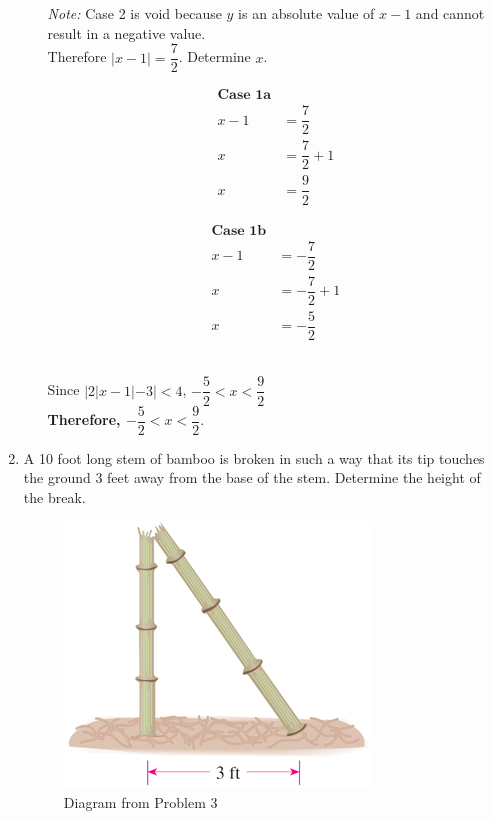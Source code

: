 \documentclass[12pt]{book}
\begin{document}
\begin{enumerate}
\begin{enumerate}
 \textit{Note:} Case 2 is void because $y$ is an absolute value of $x - 1$ and cannot result in a negative value.\\

Therefore $|x-1| = \dfrac{7}{2}$. Determine $x$.\\
\begin{minipage}{.5\textwidth}
    \begin{align*}
    \textbf{Case 1a}\\
        x - 1 &= \dfrac{7}{2}\\
        x &= \dfrac{7}{2} + 1\\
        x &= \dfrac{9}{2}
    \end{align*}      
    \end{minipage}
    \begin{minipage}{.5\textwidth}
    \begin{align*}
    \textbf{Case 1b}\\
        x - 1 &= -\dfrac{7}{2}\\
        x &= -\dfrac{7}{2} + 1\\
        x &= -\dfrac{5}{2}
    \end{align*}
\end{minipage}\\ 

Since $|2|x-1|-3| < 4$, $-\dfrac{5}{2} < x < \dfrac{9}{2}$\\

\textbf{Therefore, $-\dfrac{5}{2} < x < \dfrac{9}{2}.$\\}


\end{enumerate}

\newpage

\item A 10 foot long stem of bamboo is broken in such a way that its tip touches the ground 3 feet away from the base of the stem. Determine the height of the break.

\begin{figure}[h]
\centering
\includegraphics{bamboo.png}
\caption{Diagram from Problem 3}
\end{figure} 


\end{enumerate}
\end{document}
